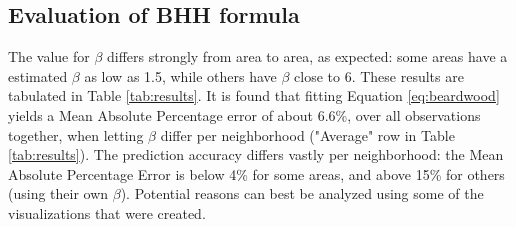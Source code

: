 \subsection{Evaluation of BHH formula}
The value for $\beta$ differs strongly from area to area, as expected: some areas have a estimated $\beta$ as low as 1.5, while others have $\beta$ close to 6.
These results are tabulated in Table \ref{tab:results}.
It is found that fitting Equation \ref{eq:beardwood} yields a Mean Absolute Percentage error of about 6.6\%, over all observations together, when
letting $\beta$ differ per neighborhood ("Average" row in Table \ref{tab:results}).
The prediction accuracy differs vastly per neighborhood: the Mean Absolute Percentage Error is below 4\% for some areas, and above 15\% for others
(using their own $\beta$).
Potential reasons can best be analyzed using some of the visualizations that were created.

